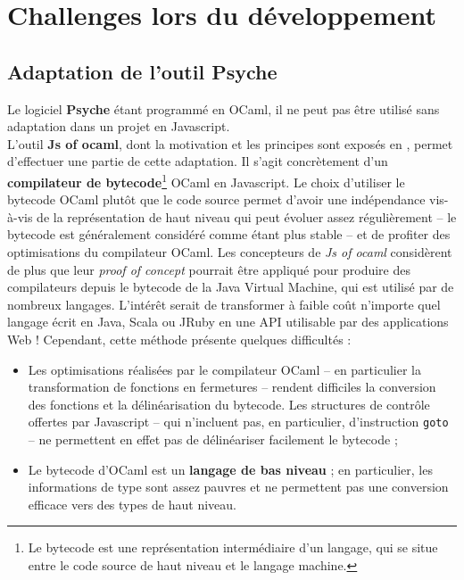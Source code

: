 \section{Challenges lors du développement}

\subsection{Adaptation de l'outil Psyche}

Le logiciel \textbf{Psyche} étant programmé en OCaml, il ne peut pas être utilisé sans adaptation dans un projet en Javascript.\\

L'outil \textbf{Js of ocaml}, dont la motivation et les principes sont exposés en \cite{vouillon2014bytecode},  permet d'effectuer une partie de cette adaptation. Il s'agit concrètement d'un \textbf{compilateur de bytecode}\footnote{Le bytecode est une représentation intermédiaire d'un langage, qui se situe entre le code source de haut niveau et le langage machine.} OCaml en Javascript. Le choix d'utiliser le bytecode OCaml plutôt que le code source permet d'avoir une indépendance vis-à-vis de la représentation de haut niveau qui peut évoluer assez régulièrement -- le bytecode est généralement considéré comme étant plus stable -- et de profiter des optimisations du compilateur OCaml. Les concepteurs de \textit{Js of ocaml} considèrent de plus que leur \textit{proof of concept} pourrait être appliqué pour produire des compilateurs depuis le bytecode de la Java Virtual Machine, qui est utilisé par de nombreux langages. L'intérêt serait de transformer à faible coût n'importe quel langage écrit en Java, Scala ou JRuby en une API utilisable par des applications Web ! Cependant, cette méthode présente quelques difficultés :\\

\begin{itemize}
\item Les optimisations réalisées par le compilateur OCaml -- en particulier la transformation de fonctions en fermetures -- rendent difficiles la conversion des fonctions et la délinéarisation du bytecode. Les structures de contrôle offertes par Javascript -- qui n'incluent pas, en particulier, d'instruction \texttt{goto} -- ne permettent en effet pas de délinéariser facilement le bytecode ; 
\item Le bytecode d'OCaml est un \textbf{langage de bas niveau} ; en particulier, les informations de type sont assez pauvres et ne permettent pas une conversion efficace vers des types de haut niveau.
\end{itemize}

